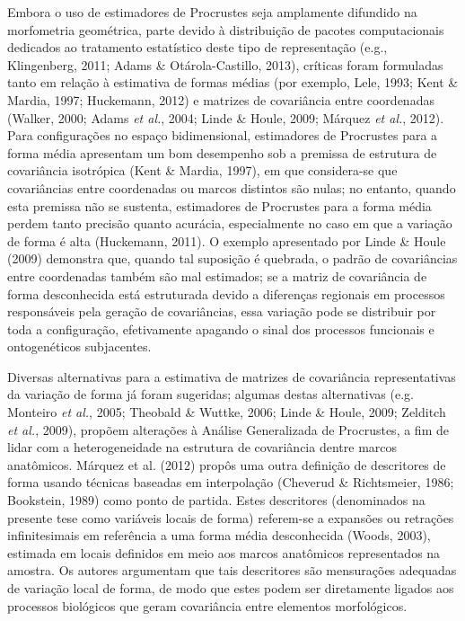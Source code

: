 \documentclass[12pt,twoside]{report}
\begin{document}
Embora o uso de estimadores de Procrustes seja amplamente difundido na
morfometria geométrica, parte devido à distribuição de pacotes
computacionais dedicados ao tratamento estatístico deste tipo de
representação (e.g., Klingenberg, 2011; Adams \& Otárola-Castillo,
2013), críticas foram formuladas tanto em relação à estimativa de formas
médias (por exemplo, Lele, 1993; Kent \& Mardia, 1997; Huckemann, 2012)
e matrizes de covariância entre coordenadas (Walker, 2000; Adams
\emph{et al.}, 2004; Linde \& Houle, 2009; Márquez \emph{et al.}, 2012).
Para configurações no espaço bidimensional, estimadores de Procrustes
para a forma média apresentam um bom desempenho sob a premissa de
estrutura de covariância isotrópica (Kent \& Mardia, 1997), em que
considera-se que covariâncias entre coordenadas ou marcos distintos são
nulas; no entanto, quando esta premissa não se sustenta, estimadores de
Procrustes para a forma média perdem tanto precisão quanto acurácia,
especialmente no caso em que a variação de forma é alta (Huckemann,
2011). O exemplo apresentado por Linde \& Houle (2009) demonstra que,
quando tal suposição é quebrada, o padrão de covariâncias entre
coordenadas também são mal estimados; se a matriz de covariância de
forma desconhecida está estruturada devido a diferenças regionais em
processos responsáveis pela geração de covariâncias, essa variação pode
se distribuir por toda a configuração, efetivamente apagando o sinal dos
processos funcionais e ontogenéticos subjacentes.

Diversas alternativas para a estimativa de matrizes de covariância
representativas da variação de forma já foram sugeridas; algumas destas
alternativas (e.g. Monteiro \emph{et al.}, 2005; Theobald \& Wuttke,
2006; Linde \& Houle, 2009; Zelditch \emph{et al.}, 2009), propõem
alterações à Análise Generalizada de Procrustes, a fim de lidar com a
heterogeneidade na estrutura de covariância dentre marcos anatômicos.
Márquez et al. (2012) propôs uma outra definição de descritores de forma
usando técnicas baseadas em interpolação (Cheverud \& Richtsmeier, 1986;
Bookstein, 1989) como ponto de partida. Estes descritores (denominados
na presente tese como variáveis locais de forma) referem-se a expansões
ou retrações infinitesimais em referência a uma forma média desconhecida
(Woods, 2003), estimada em locais definidos em meio aos marcos
anatômicos representados na amostra. Os autores argumentam que tais
descritores são mensurações adequadas de variação local de forma, de
modo que estes podem ser diretamente ligados aos processos biológicos
que geram covariância entre elementos morfológicos.
\end{document}
